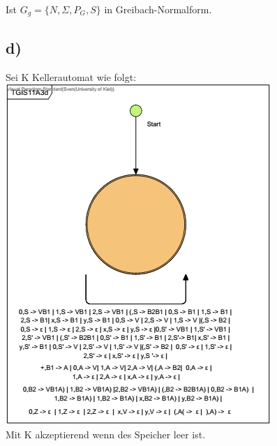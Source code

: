 Ist $G_g=\{N,\Sigma,P_G,S\}$ in Greibach-Normalform.
\subsection*{d)}

Sei K Kellerautomat wie folgt:\\
\includegraphics[width=\textwidth]{part/TGIS11A03d}\\
Mit K akzeptierend wenn des Speicher leer ist.
